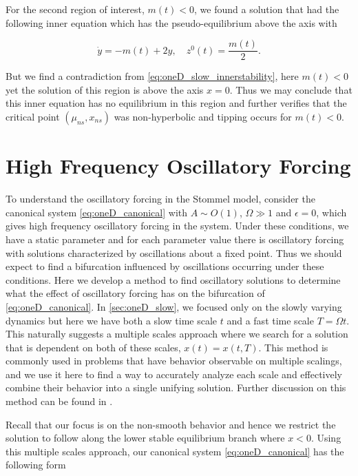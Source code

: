 For the second region of interest, $m(t)<0$, we found a solution that had the following inner equation which has the pseudo-equilibrium above the axis with

\begin{equation}\label{eq:oneD_slow_innerstability}
\dot{y}=-m(t)+2y, \quad z^0(t) = \frac{m(t)}{2}.
\end{equation}

But we find a contradiction from \eqref{eq:oneD_slow_innerstability}, here $m(t)<0$ yet the solution of this region is above the axis $x=0$. Thus we may conclude that this inner equation has no equilibrium in this region and further verifies that the critical point $(\mu_{ns},x_{ns})$ was non-hyperbolic and tipping occurs for $m(t)<0$.

\section{High Frequency Oscillatory Forcing}
\label{sec:oneD_highfreqosc}

To understand the oscillatory forcing in the Stommel model, consider the canonical system \eqref{eq:oneD_canonical} with $A\sim O(1)$, $\Omega\gg 1$ and $\epsilon=0$, which gives high frequency oscillatory forcing in the system. Under these conditions, we have a static parameter and for each parameter value there is oscillatory forcing with solutions characterized by oscillations about a fixed point. Thus we should expect to find a bifurcation influenced by oscillations occurring under these conditions. Here we develop a method to find oscillatory solutions to determine what the effect of oscillatory forcing has on the bifurcation of \eqref{eq:oneD_canonical}. In \autoref{sec:oneD_slow}, we focused only on the slowly varying dynamics but here we have both a slow time scale $t$ and a fast time scale $T=\Omega t$. This naturally suggests a multiple scales approach where we search for a solution that is dependent on both of these scales, $x(t)=x(t,T)$. This method is commonly used in problems that have behavior observable on multiple scalings, and we use it here to find a way to accurately analyze each scale and effectively combine their behavior into a single unifying solution. Further discussion on this method can be found in \cite{sanchez1996method}.

Recall that our focus is on the non-smooth behavior and hence we restrict the solution to follow along the lower stable equilibrium branch where $x<0$. Using this multiple scales approach, our canonical system \eqref{eq:oneD_canonical} has the following form

